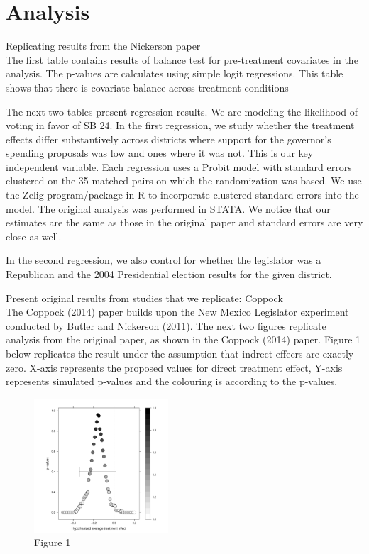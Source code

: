 \documentclass[12pt]{article}
\begin{document}
\section{Analysis}



Replicating results from the Nickerson paper \\


The first table contains results of balance test for pre-treatment covariates in the analysis. The p-values are calculates using simple logit regressions. This table shows that there is covariate balance across treatment conditions




The next two tables present regression results. We are modeling the likelihood of voting in favor of SB 24. In the first regression, we study whether the treatment effects differ substantively across districts where support for the governor's spending proposals was low and ones where it was not. This is our key independent variable. Each regression uses a Probit model with standard errors clustered on the 35 matched pairs on which the randomization was based. We use the Zelig program/package in R to incorporate clustered standard errors into the model. The original analysis was performed in STATA. We notice that our estimates are the same as those in the original paper and standard errors are very close as well.



In the second regression, we also control for whether the legislator was a Republican and the 2004 Presidential election results for the given district.





Present original results from studies that we replicate: Coppock \\

The Coppock (2014) paper builds upon the New Mexico Legislator experiment conducted by Butler and Nickerson (2011). The next two figures replicate analysis from the original paper, as shown in the Coppock (2014) paper. Figure 1 below replicates the result under the assumption that indrect effecrs are exactly zero. X-axis represents the proposed values for direct treatment effect, Y-axis represents simulated p-values and the colouring is according to the p-values.


\begin{figure}[H]
\centering
\includegraphics[height=5cm]{images/CoppockJEPS_figure1a.pdf}
\caption{Figure 1}
\end{figure}
\end{document}
